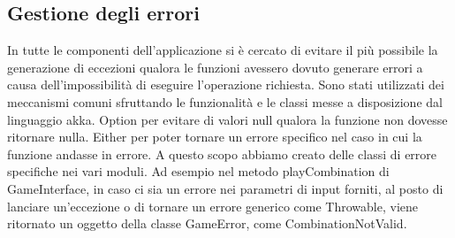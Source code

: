 \subsection[Errori]{Gestione degli errori}
In tutte le componenti dell’applicazione si è cercato di evitare il più possibile la generazione di eccezioni qualora le funzioni avessero dovuto generare errori a causa dell’impossibilità di eseguire l’operazione richiesta.
Sono stati utilizzati dei meccanismi comuni sfruttando le funzionalità e le classi messe a disposizione dal linguaggio akka.
Option per evitare di valori null qualora la funzione non dovesse ritornare nulla.
Either per poter tornare un errore specifico nel caso in cui la funzione andasse in errore.
A questo scopo abbiamo creato delle classi di errore specifiche nei vari moduli.
Ad esempio nel metodo playCombination di GameInterface, in caso ci sia un errore nei parametri di input forniti, al posto di lanciare un’eccezione o di tornare un errore generico come Throwable, viene ritornato un oggetto della classe GameError, come CombinationNotValid.

\newpage